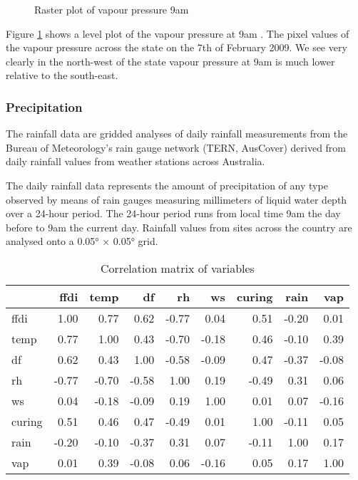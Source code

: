 \documentclass[11pt,a4paper]{article}
\begin{document}
\begin{figure}[!ht]
	\centering 
	\caption{Raster plot of vapour pressure 9am } 
	\label{fig:vap_ras} 
\end{figure}

Figure \ref{fig:vap_ras} shows a level plot of the vapour pressure at 9am \citep{rastervis}. The pixel values of the vapour pressure across the state on the 7th of February 2009. We see very clearly in the north-west of the state vapour pressure at 9am is much lower relative to the south-east. 


\subsubsection{Precipitation}

The rainfall data are gridded analyses of daily rainfall measurements from the Bureau of Meteorology's rain gauge network (TERN, AusCover) derived from daily rainfall values from weather stations across Australia. 

The daily rainfall data represents the amount of precipitation of any type observed by means of rain gauges measuring millimeters of liquid water depth over a 24-hour period. The 24-hour period runs from local time 9am the day before to 9am the current day. Rainfall values from sites across the country are analysed onto a 0.05° × 0.05° grid.

\begin{table}[!ht]
	\centering
	\begin{tabular}{lrrrrrrrr}
		\toprule
		       & ffdi  & temp  & df    & rh    & ws    & curing & rain  & vap \\
		\midrule
		ffdi   & 1.00  & 0.77  & 0.62  & -0.77 & 0.04  & 0.51   & -0.20 & 0.01 \\
		temp   & 0.77  & 1.00  & 0.43  & -0.70 & -0.18 & 0.46   & -0.10 & 0.39 \\
		df     & 0.62  & 0.43  & 1.00  & -0.58 & -0.09 & 0.47   & -0.37 & -0.08 \\
		rh     & -0.77 & -0.70 & -0.58 & 1.00  & 0.19  & -0.49  & 0.31  & 0.06 \\
		ws     & 0.04  & -0.18 & -0.09 & 0.19  & 1.00  & 0.01   & 0.07  & -0.16 \\
		curing & 0.51  & 0.46  & 0.47  & -0.49 & 0.01  & 1.00   & -0.11 & 0.05 \\
		rain   & -0.20 & -0.10 & -0.37 & 0.31  & 0.07  & -0.11  & 1.00  & 0.17 \\
		vap    & 0.01  & 0.39  & -0.08 & 0.06  & -0.16 & 0.05   & 0.17  & 1.00 \\
		\bottomrule
	\end{tabular}
	\caption{Correlation matrix of variables}
	\label{table:correl}
\end{table}
\end{document}
